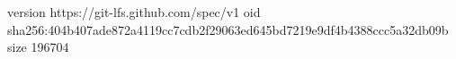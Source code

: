 version https://git-lfs.github.com/spec/v1
oid sha256:404b407ade872a4119cc7cdb2f29063ed645bd7219e9df4b4388ccc5a32db09b
size 196704
